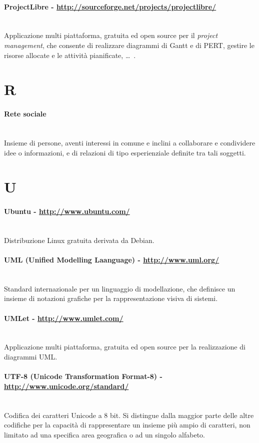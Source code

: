 \paragraph{ProjectLibre - \url{http://sourceforge.net/projects/projectlibre/}} \hfill \\
Applicazione multi piattaforma, gratuita ed open source per il \textit{project management}, che consente di realizzare diagrammi di Gantt e di PERT, gestire le risorse allocate e le attività pianificate, \ldots\ .

\section*{R}
\paragraph{Rete sociale} \hfill \\
Insieme di persone, aventi interessi in comune e inclini a collaborare e condividere idee o informazioni, e di relazioni di tipo esperienziale definite tra tali soggetti.

\section*{U}
\paragraph{Ubuntu - \url{http://www.ubuntu.com/}} \hfill \\
Distribuzione Linux gratuita derivata da Debian.
\paragraph{UML (Unified Modelling Laanguage) - \url{http://www.uml.org/}} \hfill \\
Standard internazionale per un linguaggio di modellazione, che definisce un insieme di notazioni grafiche per la rappresentazione visiva di sistemi.
\paragraph{UMLet - \url{http://www.umlet.com/}} \hfill \\
Applicazione multi piattaforma, gratuita ed open source per la realizzazione di diagrammi UML.
\paragraph{UTF-8 (Unicode Transformation Format-8) - \url{http://www.unicode.org/standard/}} \hfill \\
Codifica dei caratteri Unicode a 8 bit. Si distingue dalla maggior parte delle altre codifiche per la capacità di rappresentare un insieme più ampio di caratteri, non limitato ad una specifica area geografica o ad un singolo alfabeto.
